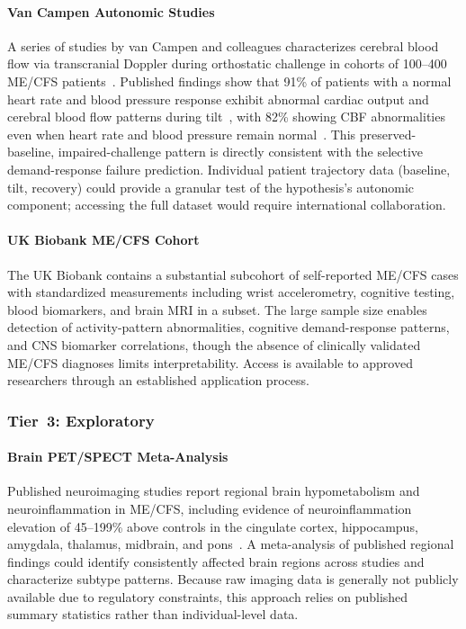 \paragraph{Van Campen Autonomic Studies}
A series of studies by van Campen and colleagues characterizes cerebral blood flow via
transcranial Doppler during orthostatic challenge in cohorts of 100--400 ME/CFS
patients~\cite{VanCampenEtAl2020, VanCampenEtAl2023, VanCampenEtAl2024}. Published
findings show that 91\% of patients with a normal heart rate and blood pressure response
exhibit abnormal cardiac output and cerebral blood flow patterns during
tilt~\cite{VanCampenEtAl2024}, with 82\% showing CBF abnormalities even when heart
rate and blood pressure remain normal~\cite{VanCampenEtAl2020}. This preserved-baseline, impaired-challenge pattern
is directly consistent with the selective demand-response failure prediction. Individual
patient trajectory data (baseline, tilt, recovery) could provide a granular test of
the hypothesis's autonomic component; accessing the full dataset would require
international collaboration.

\paragraph{UK Biobank ME/CFS Cohort}
The UK Biobank contains a substantial subcohort of self-reported ME/CFS cases with standardized
measurements including wrist accelerometry, cognitive testing, blood biomarkers, and
brain MRI in a subset. The large sample size enables detection of activity-pattern
abnormalities, cognitive demand-response patterns, and CNS biomarker correlations,
though the absence of clinically validated ME/CFS diagnoses limits interpretability.
Access is available to approved researchers through an established application process.

\subsubsection{Tier~3: Exploratory}

\paragraph{Brain PET/SPECT Meta-Analysis}
Published neuroimaging studies report regional brain hypometabolism and neuroinflammation
in ME/CFS, including evidence of neuroinflammation elevation of 45--199\% above controls
in the cingulate cortex, hippocampus, amygdala, thalamus, midbrain, and pons~\cite{Nakatomi2014Neuroinflammation}. A
meta-analysis of published regional findings could identify consistently affected brain
regions across studies and characterize subtype patterns. Because raw imaging data is
generally not publicly available due to regulatory constraints, this approach relies on
published summary statistics rather than individual-level data.

